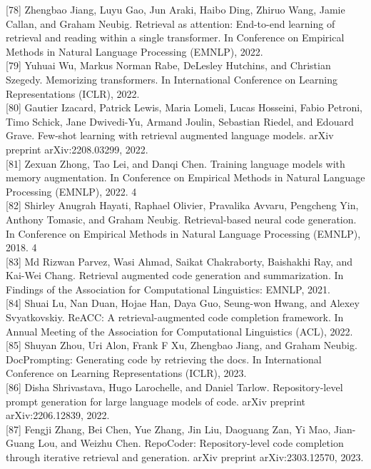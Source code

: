 \documentclass[
]{article}
\begin{document}
{[}78{]} Zhengbao Jiang, Luyu Gao, Jun Araki, Haibo Ding, Zhiruo Wang,
Jamie Callan, and Graham Neubig. Retrieval as attention: End-to-end
learning of retrieval and reading within a single transformer. In
Conference on Empirical Methods in Natural Language Processing (EMNLP),
2022.\\
{[}79{]} Yuhuai Wu, Markus Norman Rabe, DeLesley Hutchins, and Christian
Szegedy. Memorizing transformers. In International Conference on
Learning Representations (ICLR), 2022.\\
{[}80{]} Gautier Izacard, Patrick Lewis, Maria Lomeli, Lucas Hosseini,
Fabio Petroni, Timo Schick, Jane Dwivedi-Yu, Armand Joulin, Sebastian
Riedel, and Edouard Grave. Few-shot learning with retrieval augmented
language models. arXiv preprint arXiv:2208.03299, 2022.\\
{[}81{]} Zexuan Zhong, Tao Lei, and Danqi Chen. Training language models
with memory augmentation. In Conference on Empirical Methods in Natural
Language Processing (EMNLP), 2022. 4\\
{[}82{]} Shirley Anugrah Hayati, Raphael Olivier, Pravalika Avvaru,
Pengcheng Yin, Anthony Tomasic, and Graham Neubig. Retrieval-based
neural code generation. In Conference on Empirical Methods in Natural
Language Processing (EMNLP), 2018. 4\\
{[}83{]} Md Rizwan Parvez, Wasi Ahmad, Saikat Chakraborty, Baishakhi
Ray, and Kai-Wei Chang. Retrieval augmented code generation and
summarization. In Findings of the Association for Computational
Linguistics: EMNLP, 2021.\\
{[}84{]} Shuai Lu, Nan Duan, Hojae Han, Daya Guo, Seung-won Hwang, and
Alexey Svyatkovskiy. ReACC: A retrieval-augmented code completion
framework. In Annual Meeting of the Association for Computational
Linguistics (ACL), 2022.\\
{[}85{]} Shuyan Zhou, Uri Alon, Frank F Xu, Zhengbao Jiang, and Graham
Neubig. DocPrompting: Generating code by retrieving the docs. In
International Conference on Learning Representations (ICLR), 2023.\\
{[}86{]} Disha Shrivastava, Hugo Larochelle, and Daniel Tarlow.
Repository-level prompt generation for large language models of code.
arXiv preprint arXiv:2206.12839, 2022.\\
{[}87{]} Fengji Zhang, Bei Chen, Yue Zhang, Jin Liu, Daoguang Zan, Yi
Mao, Jian-Guang Lou, and Weizhu Chen. RepoCoder: Repository-level code
completion through iterative retrieval and generation. arXiv preprint
arXiv:2303.12570, 2023.\\
\end{document}
